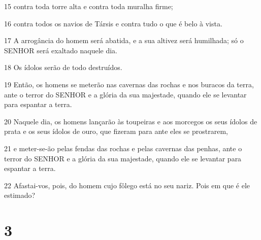 \par 15 contra toda torre alta e contra toda muralha firme;
\par 16 contra todos os navios de Társis e contra tudo o que é belo à vista.
\par 17 A arrogância do homem será abatida, e a sua altivez será humilhada; só o SENHOR será exaltado naquele dia.
\par 18 Os ídolos serão de todo destruídos.
\par 19 Então, os homens se meterão nas cavernas das rochas e nos buracos da terra, ante o terror do SENHOR e a glória da sua majestade, quando ele se levantar para espantar a terra.
\par 20 Naquele dia, os homens lançarão às toupeiras e aos morcegos os seus ídolos de prata e os seus ídolos de ouro, que fizeram para ante eles se prostrarem,
\par 21 e meter-se-ão pelas fendas das rochas e pelas cavernas das penhas, ante o terror do SENHOR e a glória da sua majestade, quando ele se levantar para espantar a terra.
\par 22 Afastai-vos, pois, do homem cujo fôlego está no seu nariz. Pois em que é ele estimado?

\chapter{3}

